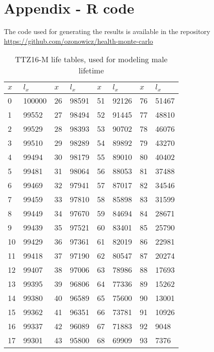 \documentclass[11pt,wide]{mwart}
\begin{document}
\section{Appendix - R code}
The code used for generating the results is available in the repository \url{https://github.com/ozonowicz/health-monte-carlo}

\begin{table}[!htbp]
	\centering
	\label{ttz_m}
	\caption{TTZ16-M life tables, used for modeling male lifetime}
	\begin{tabular}{|l|l|l|l|l|l|l|l|}
		\hline
		$x$ & $l_x$  & $x$ & $l_x$ & $x$ & $l_x$ & $x$ & $l_x$ \\ \hline
		0   & 100000 & 26  & 98591 & 51  & 92126 & 76  & 51467 \\ \hline
		1   & 99552  & 27  & 98494 & 52  & 91445 & 77  & 48810 \\ \hline
		2   & 99529  & 28  & 98393 & 53  & 90702 & 78  & 46076 \\ \hline
		3   & 99510  & 29  & 98289 & 54  & 89892 & 79  & 43270 \\ \hline
		4   & 99494  & 30  & 98179 & 55  & 89010 & 80  & 40402 \\ \hline
		5   & 99481  & 31  & 98064 & 56  & 88053 & 81  & 37488 \\ \hline
		6   & 99469  & 32  & 97941 & 57  & 87017 & 82  & 34546 \\ \hline
		7   & 99459  & 33  & 97810 & 58  & 85898 & 83  & 31599 \\ \hline
		8   & 99449  & 34  & 97670 & 59  & 84694 & 84  & 28671 \\ \hline
		9   & 99439  & 35  & 97521 & 60  & 83401 & 85  & 25790 \\ \hline
		10  & 99429  & 36  & 97361 & 61  & 82019 & 86  & 22981 \\ \hline
		11  & 99418  & 37  & 97190 & 62  & 80547 & 87  & 20274 \\ \hline
		12  & 99407  & 38  & 97006 & 63  & 78986 & 88  & 17693 \\ \hline
		13  & 99395  & 39  & 96806 & 64  & 77336 & 89  & 15262 \\ \hline
		14  & 99380  & 40  & 96589 & 65  & 75600 & 90  & 13001 \\ \hline
		15  & 99362  & 41  & 96351 & 66  & 73781 & 91  & 10926 \\ \hline
		16  & 99337  & 42  & 96089 & 67  & 71883 & 92  & 9048  \\ \hline
		17  & 99301  & 43  & 95800 & 68  & 69909 & 93  & 7376  \\ \hline

\end{tabular}
\end{table}
\end{document}
